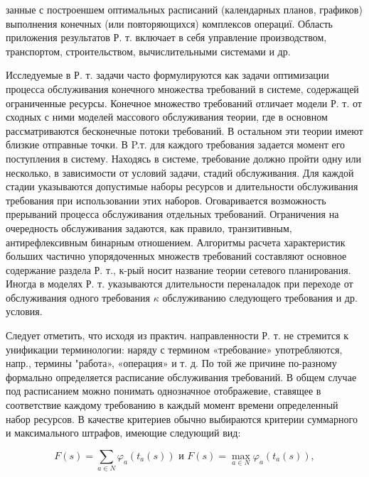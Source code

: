 \documentclass[10pt]{article}
\begin{document}
занные с построеншем оптимальных расписаний (календарных планов, графиков) выполнения конечных (или повторяющихся) комплексов операциї. Область приложения результатов Р. т. включает в себя управление производством, транспортом, строительством, вычислительными системами и др.



Исследуемые в Р. т. задачи часто формулируются как задачи оптимизации процесса обслуживания конечного множества требований в системе, содержащей ограниченные ресурсы. Конечное множество требований отличает модели Р. т. от сходных с ними моделей массового обслуживания теории, где в основном рассматриваются бесконечные потоки требований. В остальном эти теории имеют близкие отправные точки. В P.т. для каждого требования задается момент его поступления в систему. Находясь в системе, требование должно пройти одну или несколько, в зависимости от условий задачи, стадий обслуживания. Для каждой стадии указываются допустимые наборы ресурсов и длительности обслуживания требования при использовании этих наборов. Оговаривается возможность прерываний процесса обслуживания отдельных требований. Ограничения на очередность обслуживания задаются, как правило, транзитивным, антирефлексивным бинарным отношением. Алгоритмы расчета характеристик больших частично упорядоченных множеств требований составляют основное содержание раздела Р. т., к-рый носит название теории сетевого планирования. Иногда в моделях Р. т. указываются длительности переналадок при переходе от обслуживания одного требования $\kappa$ обслуживанию следующего требования и др. условия.



Следует отметить, что исходя из практич. направленности Р. т. не стремится к унификации терминологии: наряду с термином «требование» употребляются, напр., термины "работа», «операция» и т. д. По той же причине по-разному формально определяется расписание обслуживания требований. В общем случае под расписанием можно понимать однозначное отображевие, ставящее в соответствие каждому требованию в каждый момент времени определенный набор ресурсов. В качестве критериев обычно выбираются критерии суммарного и максимального штрафов, имеющие следующий вид:



\[

F(s)=\sum_{a \in N} \varphi_{a}\left(t_{a}(s)\right) \text { и } F(s)=\max _{a \in N} \varphi_{a}\left(t_{a}(s)\right),

\]
\end{document}

